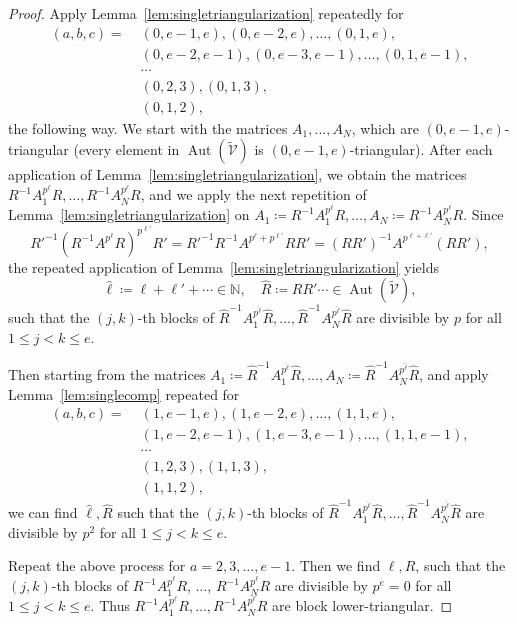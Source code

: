 \documentclass[letterpaper, 11pt, thm-restate]{article}
\numberwithin{equation}{section}
\newcommand{\N}{\mathbb{N}}
\newcommand{\Aut}{\operatorname{Aut}}
\newcommand{\tmV}{\widetilde{\mathcal{V}}}
\theoremstyle{definition}
\theoremstyle{definition}
\theoremstyle{definition}
\begin{document}
\proptriangularize*
\begin{proof}
    Apply Lemma~\ref{lem:singletriangularization} repeatedly for
    \begin{align*}
    (a, b, c) = \; & (0, e-1, e), (0, e-2, e), \ldots, (0, 1, e), \\
    & (0, e-2, e-1), (0, e-3, e-1), \ldots, (0, 1, e-1), \\
    & \cdots \\
    & (0, 2, 3), (0, 1, 3), \\
    & (0, 1, 2),
    \end{align*}
    the following way.
    We start with the matrices $A_1, \ldots, A_N$, which are $(0, e-1, e)$-triangular (every element in $\Aut(\tmV)$ is $(0, e-1, e)$-triangular).
    After each application of Lemma~\ref{lem:singletriangularization}, we obtain the matrices $R^{-1}A_1^{p^{\ell}}R, \ldots, R^{-1}A_N^{p^{\ell}}R$, and we apply the next repetition of Lemma~\ref{lem:singletriangularization} on $A_1 \coloneqq R^{-1}A_1^{p^{\ell}}R, \ldots, A_N \coloneqq R^{-1}A_N^{p^{\ell}}R$.
    Since 
    \[
    {R'}^{-1}\left(R^{-1}A^{p^{\ell}}R\right)^{p^{\ell'}} R' = {R'}^{-1}R^{-1} A^{p^{\ell} + p^{\ell'}} RR' = (RR')^{-1} A^{p^{\ell + \ell'}} (RR'),
    \]
    the repeated application of Lemma~\ref{lem:singletriangularization} yields 
    \[
    \widehat{\ell} \coloneqq \ell + \ell' + \cdots \in \N, \quad \widehat{R} \coloneqq RR' \cdots \in \Aut(\tmV),
    \]
    such that the $(j,k)$-th blocks of $\widehat{R}^{-1}A_1^{p^{\widehat{\ell}}} \widehat{R}, \ldots, \widehat{R}^{-1}A_N^{p^{\widehat{\ell}}}\widehat{R}$ are divisible by $p$ for all $1 \leq j < k \leq e$.
    
    Then starting from the matrices $A_1 \coloneqq \widehat{R}^{-1}A_1^{p^{\widehat{\ell}}} \widehat{R}, \ldots, A_N \coloneqq \widehat{R}^{-1}A_N^{p^{\widehat{\ell}}}\widehat{R}$, and apply Lemma~\ref{lem:singlecomp} repeated for
    \begin{align*}
    (a, b, c) = \; & (1, e-1, e), (1, e-2, e), \ldots, (1, 1, e), \\
    & (1, e-2, e-1), (1, e-3, e-1), \ldots, (1, 1, e-1), \\
    & \cdots \\
    & (1, 2, 3), (1, 1, 3), \\
    & (1, 1, 2),
    \end{align*}
    we can find $\widehat{\ell}, \widehat{R}$ such that the $(j,k)$-th blocks of $\widehat{R}^{-1}A_1^{p^{\widehat{\ell}}} \widehat{R}, \ldots, \widehat{R}^{-1}A_N^{p^{\widehat{\ell}}}\widehat{R}$ are divisible by $p^2$ for all $1 \leq j < k \leq e$.

    Repeat the above process for $a = 2, 3, \ldots, e-1$. Then we find $\ell, R$, such that the $(j,k)$-th blocks of $R^{-1}A_1^{p^{\ell}}R$, $\ldots$, $R^{-1}A_N^{p^{\ell}}R$ are divisible by $p^e = 0$ for all $1 \leq j < k \leq e$.
    Thus $R^{-1}A_1^{p^{\ell}}R, \ldots, R^{-1}A_N^{p^{\ell}}R$ are block lower-triangular.
\end{proof}
\end{document}
